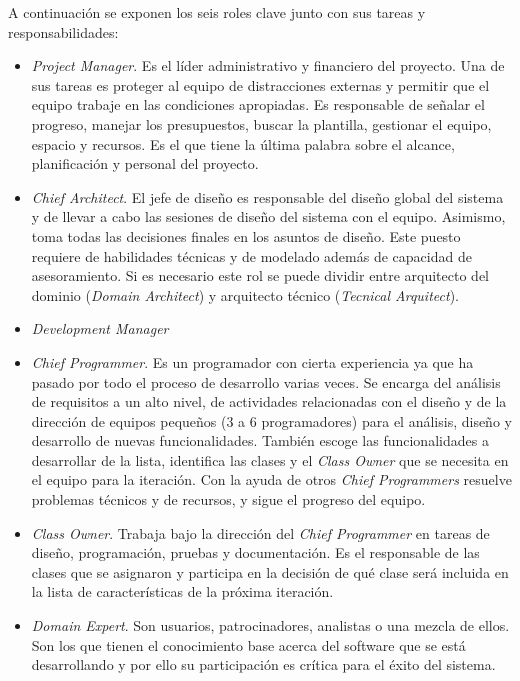 \documentclass[11pt]{article}
\begin{document}
A continuación se exponen los seis roles clave junto con sus tareas y responsabilidades:
\begin{itemize}
\item \textit{Project Manager}. Es el líder administrativo y financiero del proyecto. Una de sus tareas es proteger al equipo de distracciones externas y permitir que el equipo trabaje en las condiciones apropiadas. Es responsable de señalar el progreso, manejar los presupuestos, buscar la plantilla, gestionar el equipo, espacio y recursos. Es el que tiene la última palabra sobre el alcance, planificación y personal del proyecto.
\item \textit{Chief Architect}. El jefe de diseño es responsable del diseño global del sistema y de llevar a cabo las sesiones de diseño del sistema con el equipo. Asimismo, toma todas las decisiones finales en los asuntos de diseño. Este puesto requiere de habilidades técnicas y de modelado además de capacidad de asesoramiento. Si es necesario este rol se puede dividir entre arquitecto del dominio (\textit{Domain Architect}) y arquitecto técnico (\textit{Tecnical Arquitect}).
\item \textit{Development Manager}
\item \textit{Chief Programmer}. Es un programador con cierta experiencia ya que ha pasado por todo el proceso de desarrollo varias veces. Se encarga del análisis de requisitos a un alto nivel, de actividades relacionadas con el diseño y de la dirección de equipos pequeños (3 a 6 programadores) para el análisis, diseño y desarrollo de nuevas
funcionalidades. También escoge las funcionalidades a desarrollar de la lista, identifica las clases y el \textit{Class Owner} que se necesita en el equipo para la
iteración. Con la ayuda de otros \textit{Chief Programmers} resuelve problemas técnicos y de recursos, y sigue el progreso
del equipo.
\item \textit{Class Owner}. Trabaja bajo la dirección del \textit{Chief Programmer} en tareas de diseño, programación, pruebas y documentación. Es el responsable de las clases que se asignaron y participa en la decisión de qué clase será incluida en la lista de características de la próxima iteración.
\item \textit{Domain Expert}. Son usuarios, patrocinadores, analistas o una mezcla de ellos. Son los que tienen el conocimiento base acerca del software que se está desarrollando y por ello su participación es crítica para el éxito del sistema.
\end{itemize}
\end{document}
